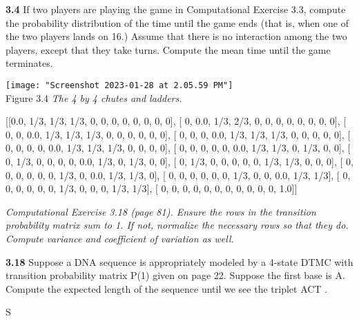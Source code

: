 \documentclass[answers]{exam}
\begin{document}
\begin{questions}
\textbf{3.4} If two players are playing the game in Computational Exercise 3.3, 
compute the probability distribution of the time until the game ends 
(that is, when one of the two players lands on 16.) 
Assume that there is no interaction among the two players, 
except that they take turns. Compute the mean time until the game terminates.

\begin{center}
	\texttt{[image: "Screenshot 2023-01-28 at 2.05.59 PM"]}
	\\ Figure 3.4 \textit{The 4 by 4 chutes and ladders.}
\end{center}

\begin{solution}

[[0.0, 1/3, 1/3, 1/3,   0,   0,   0,   0,   0,   0,   0,   0],
[   0, 0.0, 1/3, 2/3,   0,   0,   0,   0,   0,   0,   0,   0],
[   0,   0, 0.0, 1/3, 1/3, 1/3,   0,   0,   0,   0,   0,   0],
[   0,   0,   0, 0.0, 1/3, 1/3, 1/3,   0,   0,   0,   0,   0],
[   0,   0,   0,   0, 0.0, 1/3, 1/3, 1/3,   0,   0,   0,   0],
[   0,   0,   0,   0,   0, 0.0, 1/3, 1/3,   0, 1/3,   0,   0],
[   0, 1/3,   0,   0,   0,   0, 0.0, 1/3,   0, 1/3,   0,   0],
[   0, 1/3,   0,   0,   0,   0,   0, 1/3, 1/3,   0,   0,   0],
[   0,   0,   0,   0,   0,   0, 1/3,   0, 0.0, 1/3, 1/3,   0],
[   0,   0,   0,   0,   0,   0, 1/3,   0,   0, 0.0, 1/3, 1/3],
[   0,   0,   0,   0,   0,   0, 1/3,   0,   0,   0, 1/3, 1/3],
[   0,   0,   0,   0,   0,   0,   0,   0,   0,   0,   0, 1.0]]

\end{solution}

\question
\textit{Computational Exercise 3.18 (page 81). 
	Ensure the rows in the transition probability matrix sum to 1. 
	If not, normalize the necessary rows so that they do. 
	Compute variance and coefficient of variation as well.}

\textbf{3.18} Suppose a DNA sequence is appropriately modeled by a 
4-state DTMC with transition probability matrix P(1) given on page 22. 
Suppose the first base is A. 
Compute the expected length of the sequence until we see the triplet ACT .

\begin{solution}
	S
\end{solution}


\end{questions}
\end{document}
